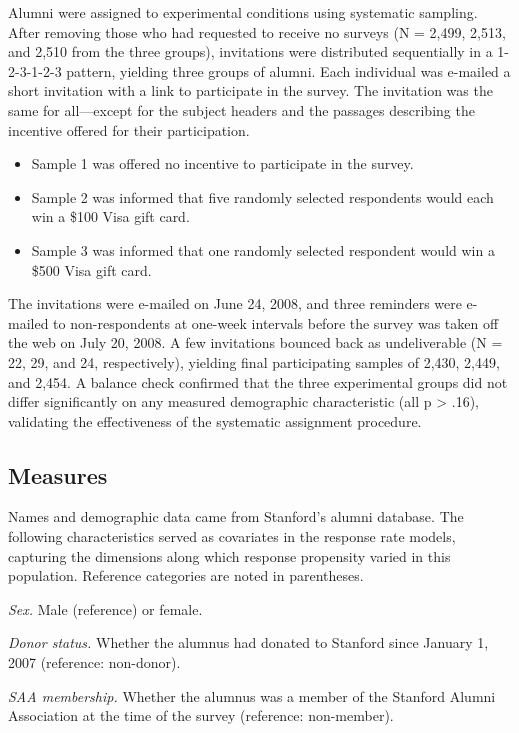 \documentclass[12pt]{article}
\begin{document}
Alumni were assigned to experimental conditions using systematic sampling. After removing those who had requested to receive no surveys (N = 2,499, 2,513, and 2,510 from the three groups), invitations were distributed sequentially in a 1-2-3-1-2-3 pattern, yielding three groups of alumni. Each individual was e-mailed a short invitation with a link to participate in the survey. The invitation was the same for all---except for the subject headers and the passages describing the incentive offered for their participation.

\begin{itemize}
    \item Sample 1 was offered no incentive to participate in the survey.
    \item Sample 2 was informed that five randomly selected respondents would each win a \$100 Visa gift card.
    \item Sample 3 was informed that one randomly selected respondent would win a \$500 Visa gift card.
\end{itemize}

The invitations were e-mailed on June 24, 2008, and three reminders were e-mailed to non-respondents at one-week intervals before the survey was taken off the web on July 20, 2008. A few invitations bounced back as undeliverable (N = 22, 29, and 24, respectively), yielding final participating samples of 2,430, 2,449, and 2,454. A balance check confirmed that the three experimental groups did not differ significantly on any measured demographic characteristic (all p > .16), validating the effectiveness of the systematic assignment procedure.

\subsection{Measures}

Names and demographic data came from Stanford's alumni database. The following characteristics served as covariates in the response rate models, capturing the dimensions along which response propensity varied in this population. Reference categories are noted in parentheses.

\textit{Sex.} Male (reference) or female.

\textit{Donor status.} Whether the alumnus had donated to Stanford since January 1, 2007 (reference: non-donor).

\textit{SAA membership.} Whether the alumnus was a member of the Stanford Alumni Association at the time of the survey (reference: non-member).
\end{document}
